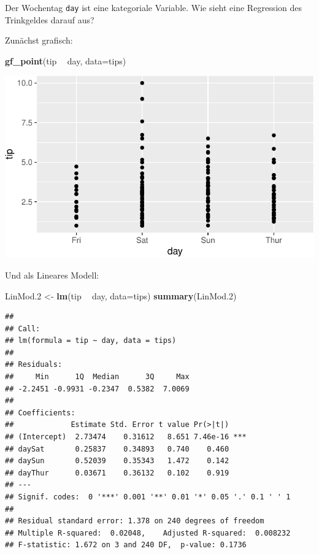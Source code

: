 \documentclass[12pt,ngerman,paper=a4,pagesize,DIV=13]{scrreprt}
\newenvironment{Shaded}{\begin{snugshade}}{\end{snugshade}}
\newcommand{\DataTypeTok}[1]{\textcolor[rgb]{0.13,0.29,0.53}{#1}}
\newcommand{\FloatTok}[1]{\textcolor[rgb]{0.00,0.00,0.81}{#1}}
\newcommand{\KeywordTok}[1]{\textcolor[rgb]{0.13,0.29,0.53}{\textbf{#1}}}
\newcommand{\NormalTok}[1]{#1}
\newcommand{\OperatorTok}[1]{\textcolor[rgb]{0.81,0.36,0.00}{\textbf{#1}}}
\newcommand{\StringTok}[1]{\textcolor[rgb]{0.31,0.60,0.02}{#1}}
\begin{document}
Der Wochentag \texttt{day} ist eine kategoriale Variable. Wie sieht eine
Regression des Trinkgeldes darauf aus?

Zunächst grafisch:

\begin{Shaded}
\begin{Highlighting}[]
\KeywordTok{gf_point}\NormalTok{(tip }\OperatorTok{~}\StringTok{ }\NormalTok{day, }\DataTypeTok{data=}\NormalTok{tips)}
\end{Highlighting}
\end{Shaded}

\includegraphics{DatenerhebungStatistik-Uebung_files/figure-latex/unnamed-chunk-169-1.pdf}

Und als Lineares Modell:

\begin{Shaded}
\begin{Highlighting}[]
\NormalTok{LinMod}\FloatTok{.2}\NormalTok{ <-}\StringTok{ }\KeywordTok{lm}\NormalTok{(tip }\OperatorTok{~}\StringTok{ }\NormalTok{day, }\DataTypeTok{data=}\NormalTok{tips)}
\KeywordTok{summary}\NormalTok{(LinMod}\FloatTok{.2}\NormalTok{)}
\end{Highlighting}
\end{Shaded}

\begin{verbatim}
## 
## Call:
## lm(formula = tip ~ day, data = tips)
## 
## Residuals:
##     Min      1Q  Median      3Q     Max 
## -2.2451 -0.9931 -0.2347  0.5382  7.0069 
## 
## Coefficients:
##             Estimate Std. Error t value Pr(>|t|)    
## (Intercept)  2.73474    0.31612   8.651 7.46e-16 ***
## daySat       0.25837    0.34893   0.740    0.460    
## daySun       0.52039    0.35343   1.472    0.142    
## dayThur      0.03671    0.36132   0.102    0.919    
## ---
## Signif. codes:  0 '***' 0.001 '**' 0.01 '*' 0.05 '.' 0.1 ' ' 1
## 
## Residual standard error: 1.378 on 240 degrees of freedom
## Multiple R-squared:  0.02048,    Adjusted R-squared:  0.008232 
## F-statistic: 1.672 on 3 and 240 DF,  p-value: 0.1736
\end{verbatim}
\end{document}
